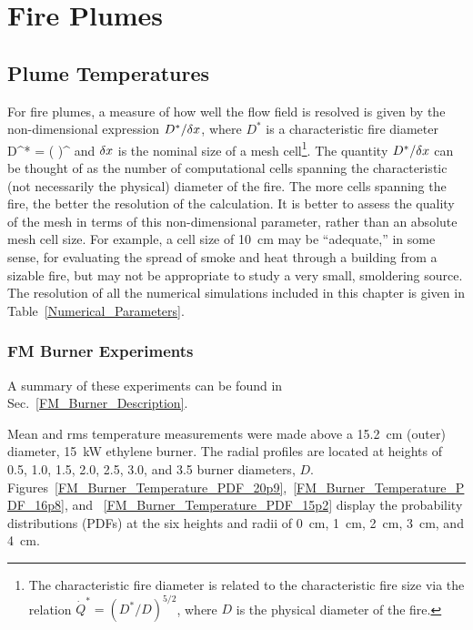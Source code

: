 
\chapter{Fire Plumes}

\section{Plume Temperatures}

For fire plumes, a measure of how well the flow field is resolved is given by the non-dimensional expression $D^*/\delta x$, where $D^*$ is a characteristic
fire diameter
\be
   D^* = \left(
     \right)^
\ee
and $\delta x$ is the nominal size of a mesh cell\footnote{The characteristic fire diameter is related to the characteristic fire size via the relation $\dot{Q}^* = (D^*/D)^{5/2}$, where $D$ is the physical diameter of the fire.}. The quantity $D^*/\delta x$ can be thought of as the number of computational cells spanning the characteristic (not necessarily the physical) diameter of the fire. The more cells spanning the fire, the better the resolution of the calculation. It is better to assess the quality of the mesh in terms of this non-dimensional parameter, rather than an absolute mesh cell size. For example, a cell size of 10~cm may be ``adequate,'' in some sense, for evaluating the spread of smoke and heat through a building from a sizable fire, but may not be appropriate to study a very small, smoldering source. The resolution of all the numerical simulations included in this chapter is given in Table~\ref{Numerical_Parameters}.

\clearpage

\subsection{FM Burner Experiments}
\label{FM_Burner_Plume_Temperature}

A summary of these experiments can be found in Sec.~\ref{FM_Burner_Description}.

Mean and rms temperature measurements were made above a 15.2~cm (outer) diameter, 15~kW ethylene burner. The radial profiles are located at heights of 0.5, 1.0, 1.5, 2.0, 2.5, 3.0, and 3.5 burner diameters, $D$. Figures~\ref{FM_Burner_Temperature_PDF_20p9},~\ref{FM_Burner_Temperature_PDF_16p8}, and ~\ref{FM_Burner_Temperature_PDF_15p2} display the probability distributions (PDFs) at the six heights and radii of 0~cm, 1~cm, 2~cm, 3~cm, and 4~cm.

